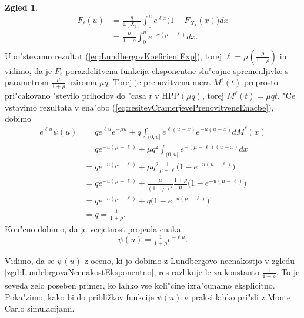 \documentclass[12pt, a4paper, reqno]{amsart}
\theoremstyle{definition}
\newtheorem{zgled}[definicija]{Zgled}
\theoremstyle{plain}
\newcommand{\E}{\mathbb{E}}
\newcommand{\1}{\mathds{1}}
\begin{document}
\begin{zgled}
                \begin{align*}
                    F_\ell(u)  &= \frac{q}{\E\left[X_1\right]}\int_0^ue^{\ell x}\bigl(1 - F_{X_1}(x)\bigr)dx \\
                            &= \frac{\mu}{1 + \rho}\int_0^ue^{-x(\mu - \ell)}dx. \\
                \end{align*}
                Upo"stevamo rezultat (\ref{eq:LundbergovKoeficientExp}), torej 
                $\ell = \mu\left(\tfrac{\rho}{1 - \rho}\right)$ in vidimo, da je $F_\ell$ porazdelitvena 
                funkcija eksponentne slu"cajne spremenljivke s parametrom $\frac{\mu}{1 + \rho}$ oziroma 
                $\mu q$. Torej je prenovitvena mera $M^\ell(t)$ preprosto pri"cakovano "stevilo prihodov do 
                "casa $t$ v $\text{HPP}(\mu q)$, torej $M^\ell(t) = \mu qt$.
                "Ce vstavimo rezultata v ena"cbo (\ref{eq:resitevCramerjevePrenovitveneEnacbe}), dobimo
                \begin{align*}
                    e^{\ell u}\psi(u)   &= qe^{\ell u}e^{-\mu u} + q\int_{(0, u]}e^{\ell(u - x)}e^{-\mu(u - x)}dM^\ell(x)\\
                                        &= qe^{-u(\mu - \ell)} + \mu q^2\int_{(0, u]}e^{-(\mu - \ell)(u - x)}dx \\
                                        &= qe^{-u(\mu - \ell)} + \mu q^2 \frac{1}{\mu - \ell}\biggl(1 - e^{-u(\mu - \ell)}\biggr)\\
                                        &= qe^{-u(\mu - \ell)} + \frac{\mu}{(1 + \rho)^2}\frac{1 + \rho}{\mu}\biggl(1 - e^{-u(\mu - \ell)}\biggr) \\
                                        &= qe^{-u(\mu - \ell)} + q\biggl(1 - e^{-u(\mu - \ell)}\biggr) \\
                                        &= q = \frac{1}{1 + \rho}.
                \end{align*}
                Kon"cno dobimo, da je verjetnost propada enaka
                \begin{equation}
                    \psi(u) =  \tfrac{1}{1+\rho}e^{-\ell u}.
                \label{eq:eksplicitnaVerjetnostPropadaExp}
                \end{equation}
            \end{zgled}

                Vidimo, da se $\psi(u)$ z oceno, ki jo dobimo z Lundbergovo neenakostjo v zgledu \ref{zgd:LundebrgovaNeenakostEksponentno}, 
                res razlikuje le za konstanto $\tfrac{1}{1 + \rho}$.
                To je seveda zelo poseben primer, ko lahko vse koli"cine izra"cunamo eksplicitno.
                Poka"zimo, kako bi do približkov funkcije $\psi(u)$ v praksi lahko pri"sli z Monte 
                Carlo simulacijami.
            
\end{document}
